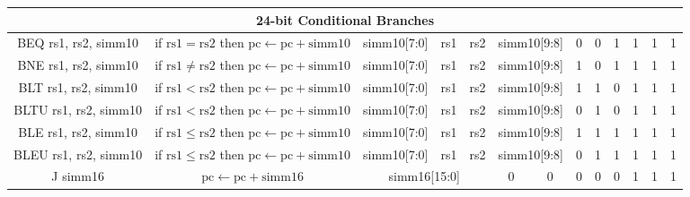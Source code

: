 \documentclass[a4paper,10pt]{article}
\begin{document}
\begin{landscape}
\begin{longtable}[c]{|c|c|@{}c@{}|@{}c@{}|@{}c@{}|@{}c@{}|@{}c@{}|@{}c@{}|@{}c@{}|@{}c@{}|@{}c@{}|@{}c@{}|@{}c@{}|@{}c@{}|@{}c@{}|@{}c@{}|@{}c@{}|@{}c@{}|@{}c@{}|@{}c@{}|@{}c@{}|@{}c@{}|@{}c@{}|@{}c@{}|@{}c@{}|@{}c@{}|}
\hline
\multicolumn{26}{|c|}{24-bit Conditional Branches}                                                                                                                                                                                                                                                             \\\hline
BEQ rs1, rs2, simm10  & if $\mathrm{rs1} = \mathrm{rs2}$ then $\mathrm{pc} \leftarrow \mathrm{pc} + \mathrm{simm10}$ & \multicolumn{8}{c|}{simm10{[}7:0{]}}                        & \multicolumn{4}{c|}{rs1}            & \multicolumn{4}{c|}{rs2}     & \multicolumn{2}{c|}{simm10{[}9:8{]}} & 0   & 0   & 1   & 1 & 1 & 1 \\
BNE rs1, rs2, simm10  & if $\mathrm{rs1} \neq \mathrm{rs2}$ then $\mathrm{pc} \leftarrow \mathrm{pc} + \mathrm{simm10}$ & \multicolumn{8}{c|}{simm10{[}7:0{]}}                        & \multicolumn{4}{c|}{rs1}            & \multicolumn{4}{c|}{rs2}     & \multicolumn{2}{c|}{simm10{[}9:8{]}} & 1   & 0   & 1   & 1 & 1 & 1 \\
BLT rs1, rs2, simm10  & if $\mathrm{rs1} < \mathrm{rs2}$ then $\mathrm{pc} \leftarrow \mathrm{pc} + \mathrm{simm10}$ & \multicolumn{8}{c|}{simm10{[}7:0{]}}                        & \multicolumn{4}{c|}{rs1}            & \multicolumn{4}{c|}{rs2}     & \multicolumn{2}{c|}{simm10{[}9:8{]}} & 1   & 1   & 0   & 1 & 1 & 1 \\
BLTU rs1, rs2, simm10 & if $\mathrm{rs1} < \mathrm{rs2}$ then $\mathrm{pc} \leftarrow \mathrm{pc} + \mathrm{simm10}$ & \multicolumn{8}{c|}{simm10{[}7:0{]}}                        & \multicolumn{4}{c|}{rs1}            & \multicolumn{4}{c|}{rs2}     & \multicolumn{2}{c|}{simm10{[}9:8{]}} & 0   & 1   & 0   & 1 & 1 & 1 \\
BLE rs1, rs2, simm10  & if $\mathrm{rs1} \le \mathrm{rs2}$ then $\mathrm{pc} \leftarrow \mathrm{pc} + \mathrm{simm10}$ & \multicolumn{8}{c|}{simm10{[}7:0{]}}                        & \multicolumn{4}{c|}{rs1}            & \multicolumn{4}{c|}{rs2}     & \multicolumn{2}{c|}{simm10{[}9:8{]}} & 1   & 1   & 1   & 1 & 1 & 1 \\
BLEU rs1, rs2, simm10 & if $\mathrm{rs1} \le \mathrm{rs2}$ then $\mathrm{pc} \leftarrow \mathrm{pc} + \mathrm{simm10}$ & \multicolumn{8}{c|}{simm10{[}7:0{]}}                        & \multicolumn{4}{c|}{rs1}            & \multicolumn{4}{c|}{rs2}     & \multicolumn{2}{c|}{simm10{[}9:8{]}} & 0   & 1   & 1   & 1 & 1 & 1 \\
J simm16              & $\mathrm{pc} \leftarrow \mathrm{pc} + \mathrm{simm16}$ & \multicolumn{16}{c|}{simm16{[}15:0{]}}                                                                                         & 0              & 0              & 0 & 0   & 0   & 1 & 1 & 1 \\

\end{longtable}
\end{landscape}
\end{document}
